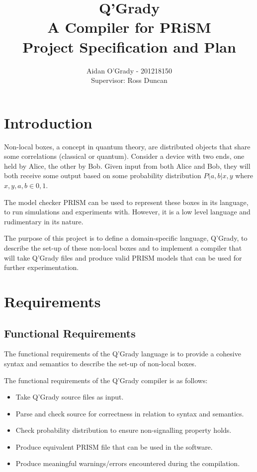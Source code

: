 \documentclass[11pt, a4paper]{article}
\begin{document}
\title{Q'Grady \\A Compiler for PRiSM \\
\large{Project Specification and Plan}}
\author{Aidan O'Grady - 201218150\\Supervisor: Ross Duncan}
\date{}
\maketitle

\section{Introduction} %
\label{sec:introduction}
Non-local boxes, a concept in quantum theory, are distributed objects that share
some correlations (classical or quantum). Consider a device with two ends, one
held by Alice, the other by Bob. Given input from both Alice and Bob, they will
both receive some output based on some probability distribution \(P(a,b|x,y\)
where \(x,y,a,b \in {0,1}\).

The model checker PRISM can be used to represent these boxes in its language,
to run simulations and experiments with. However, it is a low level language and
rudimentary in its nature.

The purpose of this project is to define a domain-specific language, Q'Grady, to
describe the set-up of these non-local boxes and to implement a compiler that
will take Q'Grady files and produce valid PRISM models that can be used for
further experimentation.


\section{Requirements} %
\label{sec:requirements}
\subsection{Functional Requirements} %
\label{sub:functional_requirements}
The functional requirements of the Q'Grady language is to provide a cohesive
syntax and semantics to describe the set-up of non-local boxes.

The functional requirements of the Q'Grady compiler is as follows:
\begin{itemize}
    \item Take Q'Grady source files as input.
    \item Parse and check source for correctness in relation to syntax and
    semantics.
    \item Check probability distribution to ensure non-signalling property
    holds.
    \item Produce equivalent PRISM file that can be used in the software.
    \item Produce meaningful warnings/errors encountered during the
    compilation.
\end{itemize}
\end{document}
